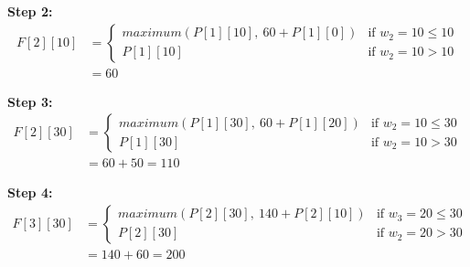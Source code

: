 \begin{itemize}
\begin{itemize}
			\textbf{Step 2: }
			\begin{align*}
				F[2][10] &= 
				\begin{cases}
					maximum(P[1][10], \ 60 + P[1][0]) & \mbox{if }  w_2 = 10 \leq 10 \\
					P[1][10] & \mbox{if } w_2 = 10 > 10
				\end{cases} \\
				&= 60
			\end{align*}
			
			\textbf{Step 3: }
			\begin{align*}
				F[2][30] &= 
				\begin{cases}
					maximum(P[1][30], \ 60 + P[1][20]) & \mbox{if }  w_2 = 10 \leq 30 \\
					P[1][30] & \mbox{if } w_2 = 10 > 30
				\end{cases} \\
				&= 60 + 50 = 110
			\end{align*}
			
			\textbf{Step 4: }
			\begin{align*}
				F[3][30] &= 
				\begin{cases}
					maximum(P[2][30], \ 140 + P[2][10]) & \mbox{if }  w_3 = 20 \leq 30 \\
					P[2][30] & \mbox{if } w_2 = 20 > 30
				\end{cases} \\
				&= 140 + 60 = 200
			\end{align*}
		\end{itemize}
	\end{itemize}

	
	 
	\textcolor{white}{\cite{martin_01_2020}\cite{neopolitan_foundations_nodate}\cite{noauthor_knapsack_nodate}\cite{noauthor_knapsack_nodate-2}}
	
